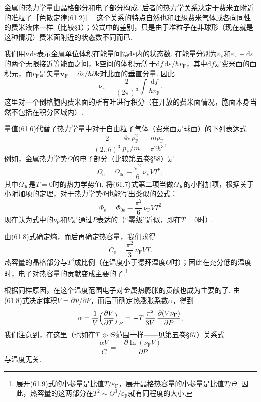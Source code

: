 金属的热力学量由晶格部分和电子部分构成. 后者的热力学关系决定于费米面附近的准粒子［色散定律(61.2)］. 这个关系的特点自然也和理想费米气体或各向同性的费米液体一样（比较§1）；公式中的差别，只是由于准粒子在非球形（现在就是这种情况）费米面附近的状态数不同而已.

我们用$\nu\,\mathrm d\varepsilon$表示金属单位体积在能量间隔$\mathrm d\varepsilon$内的状态数. 在能量分别为$\varepsilon_{\mathrm F}$和$\varepsilon_{\mathrm F}+\mathrm d\varepsilon$的两个无限接近等能面之间，$\bm k$空间的体积元等于$\mathrm df\,\mathrm d\varepsilon/\hbar v_{\mathrm F}$，其中$\mathrm df$是费米面的面积元，而$v_{\mathrm F}$是矢量$\bm v_{\mathrm F}=\partial\varepsilon/\hbar\partial\bm k$对此面的垂直分量. 因此
\begin{equation}
\nu_{\mathrm F}=\frac{2}{(2\pi)^3}\int\frac{\mathrm df}{\hbar v_{\mathrm F}}.
\label{61.6}
\end{equation}
这里对一个倒格胞内费米面的所有叶进行积分（在开放的费米面情况，胞面本身当然不包括在积分区域内）.

量值(61.6)代替了热力学量中对于自由粒子气体（费米面是球面）的下列表达式
\begin{equation*}
\frac{2}{(2\pi\hbar)^3}\,\frac{4\pi p^2_{\mathrm F}}{p_{\mathrm F}/m}=\frac{mp_{\mathrm F}}{\pi^2\hbar^3},
\end{equation*}
例如，金属热力学势$\Omega$的电子部分（比较第五卷§58）是
\begin{equation}
\Omega_{\mathrm e}=\Omega_{0\mathrm e}-\frac{\pi^2}{6}\,\nu_{\mathrm F}VT^2,
\label{61.7}
\end{equation}
其中$\Omega_{0\mathrm e}$是$T=0$时的热力学势值. 将(61.7)式第二项当做$\Omega_{0\mathrm e}$的小附加项，根据关于小附加项的定理，对于热力学势$\varPhi$也能写出类似的公式：
\begin{equation}
\varPhi_{\mathrm e}=\varPhi_{0\mathrm e}-\frac{\pi^2}{6}\,\nu_{\mathrm F}VT^2
\label{61.8}
\end{equation}
现在认为式中的$\nu_{\mathrm F}$和$V$是通过$P$表达的（“零级”近似，即在$T=0$时）.

由(61.8)式确定熵，而后再确定热容量，我们求得
\begin{equation}
C_{\mathrm e}=\frac{\pi^2}{3}\,\nu_{\mathrm F}VT.
\label{61.9}
\end{equation}
热容量的晶格部分与$T^3$成比例（在温度小于德拜温度$\Theta$时）；因此在充分低的温度时，电子对热容量的贡献变成主要的了.\footnote{展开(61.9)式的小参量是比值$T/\varepsilon_{\mathrm F}$，展开晶格热容量的小参量是比值$T/\Theta$. 因此，热容量的这两部分在$T^2\sim\Theta^3/\varepsilon_{\mathrm F}$就有同程度的大小.}

根据同样原因，在这个温度范围电子对金属热膨胀的贡献也成为主要的了. 由(61.8)式决定体积$V=\partial\varPhi/\partial P$，而后再确定热膨胀系数$\alpha$，得到
\begin{equation}
\alpha=\frac{1}{V}\Bigl(\frac{\partial V}{\partial T}\Bigr)_P
=-T\,\frac{\pi^2}{3V}\,\frac{\partial(V\nu_{\mathrm F})}{\partial P},
\label{61.10}
\end{equation}
我们注意到，在这里（也如在$T\gg\Theta$范围一样——见第五卷§67）关系式
\begin{equation*}
\frac{\alpha V}{C}=-\frac{\partial\ln(\nu_{\mathrm F}V)}{\partial P}
\end{equation*}
与温度无关.
